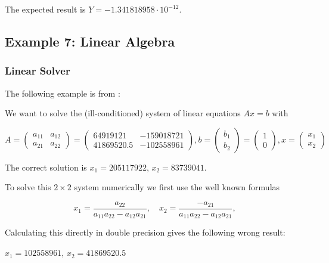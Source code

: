 The expected result is $Y = -1.341818958 \cdot 10^{-12}$.





\subsection{Example 7: Linear Algebra}


\subsubsection{Linear Solver}
The following example is from \cite{Hofschuster2004}:

We want to solve the (ill-conditioned) system of linear equations $Ax = b$ with

\begin{equation}
A = \begin{pmatrix}
a_{11} & a_{12} \\
a_{21} & a_{22} 
\end{pmatrix}  = \begin{pmatrix}
64919121 & -159018721 \\
41869520.5 & -102558961 
\end{pmatrix}, b = \begin{pmatrix}
b_{1} \\
b_{2} 
\end{pmatrix}
= \begin{pmatrix}
1 \\
0
\end{pmatrix} , x = \begin{pmatrix}
x_{1} \\
x_{2} 
\end{pmatrix}
\end{equation}

The correct solution is $x_1 = 205117922$, $x_2 = 83739041$.

To solve this $2 \times 2$ system numerically we first use the well known formulas

\begin{equation}
x_1 = \frac{a_{22}}{a_{11}a_{22} - a_{12}a_{21}}, \quad x_2 = \frac{-a_{21}}{a_{11}a_{22} - a_{12}a_{21}},
\end{equation}

Calculating this directly in double precision gives the following wrong result:  

$x_1 = 102558961$, $x_2 = 41869520.5$

%






